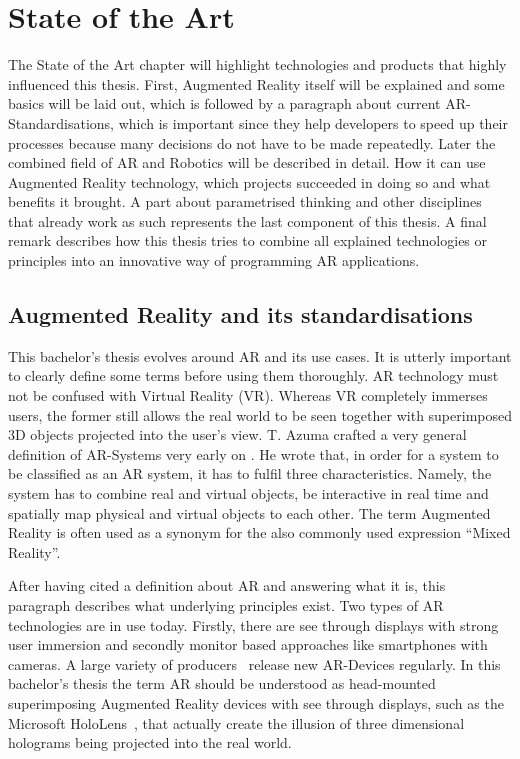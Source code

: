 \chapter{State of the Art}\label{Chap:StateOfTheArt}

The State of the Art chapter will highlight technologies and products that highly influenced this thesis. First, Augmented Reality itself will be explained and some basics will be laid out, which is followed by a paragraph about current AR-Standardisations, which is important since they help developers to speed up their processes because many decisions do not have to be made repeatedly. Later the combined field of AR and Robotics will be described in detail. How it can use Augmented Reality technology, which projects succeeded in doing so and what benefits it brought. A part about parametrised thinking and other disciplines that already work as such represents the last component of this thesis. A final remark describes how this thesis tries to combine all explained technologies or principles into an innovative way of programming AR applications.

\section{Augmented Reality and its standardisations}

This bachelor's thesis evolves around AR and its use cases. It is utterly important to clearly define some terms before using them thoroughly. AR technology must not be confused with Virtual Reality (VR). Whereas VR completely immerses users, the former still allows the real world to be seen together with superimposed 3D objects projected into the user's view. T. Azuma crafted a very general definition of AR-Systems very early on \cite{azuma1997survey}. He wrote that, in order for a system to be classified as an AR system, it has to fulfil three characteristics. Namely, the system has to combine real and virtual objects, be interactive in real time and spatially map physical and virtual objects to each other. The term Augmented Reality is often used as a synonym for the also commonly used expression “Mixed Reality”. 

After having cited a definition about AR and answering what it is, this paragraph describes what underlying principles exist. Two types of AR technologies are in use today. Firstly, there are see through displays with strong user immersion and secondly monitor based approaches like smartphones with cameras. A large variety of producers~\cite{ARProudcersVariety} release new AR-Devices regularly. In this bachelor's thesis the term AR should be understood as head-mounted superimposing Augmented Reality devices with see through displays, such as the Microsoft HoloLens~\cite{MSHoloLens}, that actually create the illusion of three dimensional holograms being projected into the real world.

